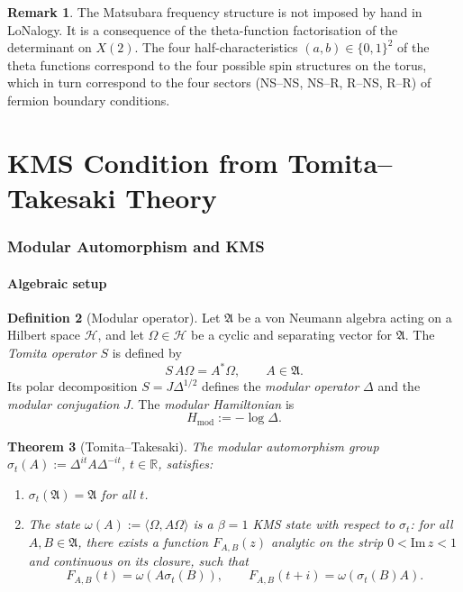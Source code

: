 \documentclass[12pt]{article}
\theoremstyle{plain}
\newtheorem{theorem}{Theorem}[section]
\theoremstyle{definition}
\newtheorem{definition}[theorem]{Definition}
\newtheorem{remark}[theorem]{Remark}
\numberwithin{equation}{section}
\newcommand{\R}{\mathbb{R}}
\begin{document}
\begin{remark}
The Matsubara frequency structure is not imposed by hand in LoNalogy.
It is a consequence of the theta-function factorisation of the
determinant on $X(2)$.  The four half-characteristics
$(a,b)\in\{0,1\}^2$ of the theta functions correspond to the four
possible spin structures on the torus, which in turn correspond to
the four sectors (NS--NS, NS--R, R--NS, R--R) of fermion boundary
conditions.
\end{remark}


\part{KMS Condition from Tomita--Takesaki Theory}

\section{Modular Automorphism and KMS}\label{sec:kms}

\subsection{Algebraic setup}

\begin{definition}[Modular operator]
Let $\mathfrak{A}$ be a von Neumann algebra acting on a Hilbert space
$\mathcal{H}$, and let $\Omega\in\mathcal{H}$ be a cyclic and
separating vector for $\mathfrak{A}$.  The \emph{Tomita operator} $S$
is defined by
\begin{equation}
S\,A\Omega = A^*\Omega,\qquad A\in\mathfrak{A}.
\end{equation}
Its polar decomposition $S=J\Delta^{1/2}$ defines the \emph{modular
operator} $\Delta$ and the \emph{modular conjugation} $J$.  The
\emph{modular Hamiltonian} is
\begin{equation}
H_{\mathrm{mod}} := -\log\Delta.
\end{equation}
\end{definition}

\begin{theorem}[Tomita--Takesaki]\label{thm:TT}
The modular automorphism group
$\sigma_t(A):=\Delta^{it}A\Delta^{-it}$, $t\in\R$,
satisfies:
\begin{enumerate}[label=(\roman*)]
\item $\sigma_t(\mathfrak{A})=\mathfrak{A}$ for all $t$.
\item The state $\omega(A):=\langle\Omega,A\Omega\rangle$ is a
$\beta=1$ KMS state with respect to $\sigma_t$:
for all $A,B\in\mathfrak{A}$, there exists a function
$F_{A,B}(z)$ analytic on the strip $0<\mathrm{Im}\,z<1$ and
continuous on its closure, such that
\begin{equation}
F_{A,B}(t) = \omega(A\sigma_t(B)),\qquad
F_{A,B}(t+i) = \omega(\sigma_t(B)A).
\end{equation}
\end{enumerate}
\end{theorem}
\end{document}
